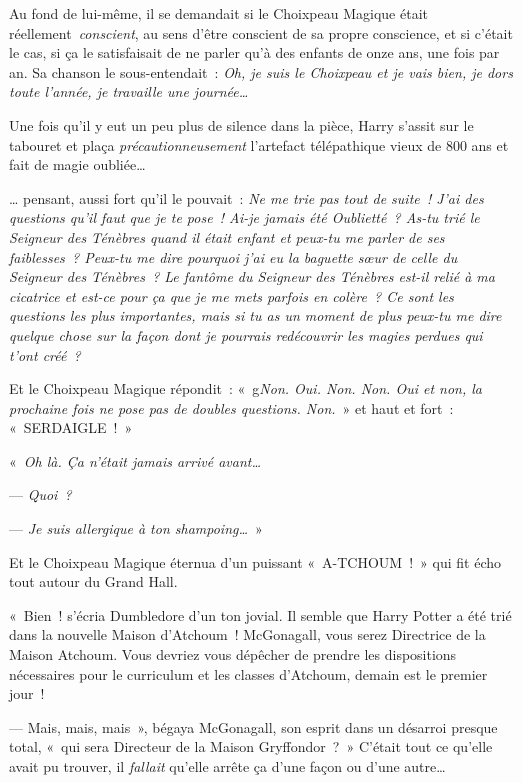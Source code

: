 \later

Au fond de lui-même, il se demandait si le Choixpeau Magique était réellement~\emph{conscient}, au sens d'être conscient de sa propre conscience, et si c'était le cas, si ça le satisfaisait de ne parler qu'à des enfants de onze ans, une fois par an. Sa chanson le sous-entendait~: \emph{Oh, je suis le Choixpeau et je vais bien, je dors toute l'année, je travaille une journée…}

Une fois qu'il y eut un peu plus de silence dans la pièce, Harry s'assit sur le tabouret et plaça \emph{précautionneusement} l'artefact télépathique vieux de 800 ans et fait de magie oubliée…

… pensant, aussi fort qu'il le pouvait~: \emph{Ne me trie pas tout de suite~! J'ai des questions qu'il faut que je te pose~! Ai-je jamais été Oublietté~? As-tu trié le Seigneur des Ténèbres quand il était enfant et peux-tu me parler de ses faiblesses~? Peux-tu me dire pourquoi j'ai eu la baguette sœur de celle du Seigneur des Ténèbres~? Le fantôme du Seigneur des Ténèbres est-il relié à ma cicatrice et est-ce pour ça que je me mets parfois en colère~? Ce sont les questions les plus importantes, mais si tu as un moment de plus peux-tu me dire quelque chose sur la façon dont je pourrais redécouvrir les magies perdues qui t'ont créé~?}

Et le Choixpeau Magique répondit~: «~g\emph{Non. Oui. Non. Non. Oui et non, la prochaine fois ne pose pas de doubles questions. Non.}~» et haut et fort~: «~SERDAIGLE~!~»

\later

«~\emph{Oh là. Ça n'était jamais arrivé avant…}

--- \emph{Quoi~?}

--- \emph{Je suis allergique à ton shampoing…}~»

Et le Choixpeau Magique éternua d'un puissant «~A-TCHOUM~!~» qui fit écho tout autour du Grand Hall.

«~Bien~! s'écria Dumbledore d'un ton jovial. Il semble que Harry Potter a été trié dans la nouvelle Maison d'Atchoum~! McGonagall, vous serez Directrice de la Maison Atchoum. Vous devriez vous dépêcher de prendre les dispositions nécessaires pour le curriculum et les classes d'Atchoum, demain est le premier jour~!

--- Mais, mais, mais~», bégaya McGonagall, son esprit dans un désarroi presque total, «~qui sera Directeur de la Maison Gryffondor~?~» C'était tout ce qu'elle avait pu trouver, il \emph{fallait} qu'elle arrête ça d'une façon ou d'une autre…

